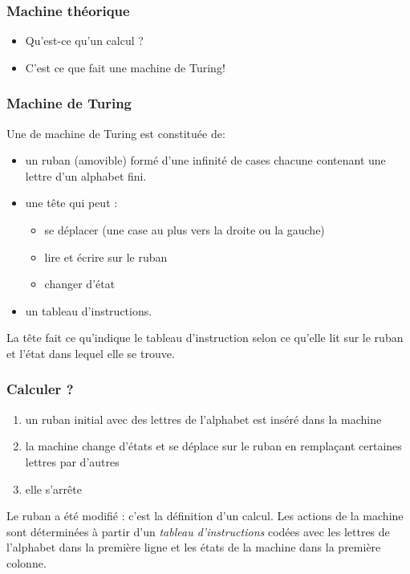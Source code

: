 


\begin{frame}
\frametitle{Machine théorique}
\begin{itemize}
  \item Qu'est-ce qu'un calcul ?
  \pause \item C'est ce que fait une machine de Turing!
\end{itemize}
\end{frame}

\begin{frame}
\frametitle{Machine de Turing}
Une de machine de Turing est constituée de:
\begin{itemize}
  \item un ruban (amovible) formé d'une infinité de cases chacune contenant une lettre d'un alphabet fini.
  \item une tête qui peut :
  \begin{itemize}
    \item se déplacer (une case au plus vers la droite ou la gauche)
    \item lire et écrire sur le ruban
    \item changer d'état
  \end{itemize}
  \item un tableau d'instructions.
\end{itemize}
La tête fait ce qu'indique le tableau d'instruction selon ce qu'elle lit sur le ruban et l'état dans lequel elle se trouve. 
\end{frame}

\begin{frame}
  \frametitle{Calculer ?}
\begin{enumerate}
  \item un ruban initial avec des lettres de l'alphabet est inséré dans la machine
  \item la machine change d'états et se déplace sur le ruban en remplaçant certaines lettres par d'autres
  \item elle s'arrête
\end{enumerate}
Le ruban a été modifié : c'est la définition d'un \og calcul\fg. \newline
Les actions de la machine sont déterminées à partir d'un \emph{tableau d'instructions} codées avec les lettres de l'alphabet dans la première ligne et les états de la machine dans la première colonne.
\end{frame}

